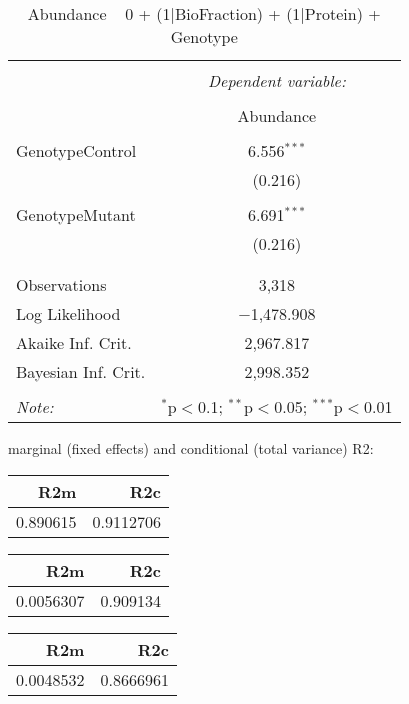 \documentclass[11pt]{report}
\begin{document}
\begin{table}[!htbp] \centering 
  \caption{Abundance ~ 0 + (1|BioFraction) + (1|Protein) + Genotype} 
  \label{} 
\begin{tabular}{@{\extracolsep{5pt}}lc} 
\\[-1.8ex]\hline 
\hline \\[-1.8ex] 
 & \multicolumn{1}{c}{\textit{Dependent variable:}} \\ 
\cline{2-2} 
\\[-1.8ex] & Abundance \\ 
\hline \\[-1.8ex] 
 GenotypeControl & 6.556$^{***}$ \\ 
  & (0.216) \\ 
  & \\ 
 GenotypeMutant & 6.691$^{***}$ \\ 
  & (0.216) \\ 
  & \\ 
\hline \\[-1.8ex] 
Observations & 3,318 \\ 
Log Likelihood & $-$1,478.908 \\ 
Akaike Inf. Crit. & 2,967.817 \\ 
Bayesian Inf. Crit. & 2,998.352 \\ 
\hline 
\hline \\[-1.8ex] 
\textit{Note:}  & \multicolumn{1}{r}{$^{*}$p$<$0.1; $^{**}$p$<$0.05; $^{***}$p$<$0.01} \\ 
\end{tabular} 
\end{table} 
marginal (fixed effects) and conditional (total variance) R2:

\begin{tabular}{r|r}
\hline
R2m & R2c\\
\hline
0.890615 & 0.9112706\\
\hline
\end{tabular}

\begin{tabular}{r|r}
\hline
R2m & R2c\\
\hline
0.0056307 & 0.909134\\
\hline
\end{tabular}

\begin{tabular}{r|r}
\hline
R2m & R2c\\
\hline
0.0048532 & 0.8666961\\
\hline
\end{tabular}
\end{document}
